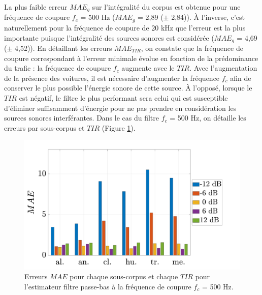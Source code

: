 La plus faible erreur $MAE_g$ sur l'intégralité du corpus est obtenue pour une fréquence de coupure $f_c$ = 500 Hz ($MAE_g$ = 2,89 ($\pm$ 2,84)).
\`A l'inverse, c'est naturellement pour la fréquence de coupure de 20 kHz que l'erreur est la plus importante puisque l'intégralité des sources sonores est considérée ($MAE_g$ = 4,69 ($\pm$ 4,52)). 
En détaillant les erreurs $MAE_{TIR}$, on constate que la fréquence de coupure correspondant à l'erreur minimale évolue en fonction de la prédominance du trafic : la fréquence de coupure $f_c$ augmente avec le $TIR$.
Avec l'augmentation de la présence des voitures, il est nécessaire d'augmenter la fréquence $f_c$ afin de conserver le plus possible l'énergie sonore de cette source. \`A l'opposé, lorsque le $TIR$ est négatif, le filtre le plus performant sera celui qui est susceptible d'éliminer suffisamment d'énergie pour ne pas prendre en considération les sources sonores interférantes.
Dans le cas du filtre $f_c$ = 500 Hz,  on détaille les erreurs par sous-corpus et $TIR$ (Figure \ref{fig:filtre_amb_tir}). 

\begin{figure}[h!]
\centering
\includegraphics[width=0.7\linewidth]{./figures/resultats/amb_filtre_500_bar.pdf}
\caption{Erreurs $MAE$ pour chaque sous-corpus et chaque $TIR$ pour l'estimateur filtre passe-bas à la fréquence de coupure $f_c$ = 500 Hz.}
\label{fig:filtre_amb_tir}
\end{figure}

